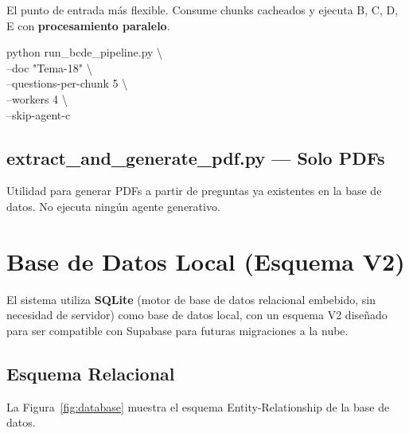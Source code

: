 \documentclass[10pt,twocolumn,letterpaper]{article}
\begin{document}
El punto de entrada m\'as flexible. Consume chunks cacheados y ejecuta B, C, D, E
con \textbf{procesamiento paralelo}.

\begin{tcolorbox}[colback=bglight, colframe=bordercolor, boxrule=0.5pt, arc=2pt]
{\small\ttfamily
python run\_bcde\_pipeline.py \textbackslash\\
\hspace*{1em}--doc "Tema-18" \textbackslash\\
\hspace*{1em}--questions-per-chunk 5 \textbackslash\\
\hspace*{1em}--workers 4 \textbackslash\\
\hspace*{1em}--skip-agent-c
}
\end{tcolorbox}

\subsection{extract\_and\_generate\_pdf.py --- Solo PDFs}

Utilidad para generar PDFs a partir de preguntas ya existentes en la base
de datos. No ejecuta ning\'un agente generativo.

\section{Base de Datos Local (Esquema V2)}

El sistema utiliza \textbf{SQLite} (motor de base de datos relacional embebido,
sin necesidad de servidor) como base de datos local, con un esquema V2
dise\~nado para ser compatible con Supabase para futuras migraciones a la nube.

\subsection{Esquema Relacional}

La Figura~\ref{fig:database} muestra el esquema Entity-Relationship de la base
de datos.
\end{document}
